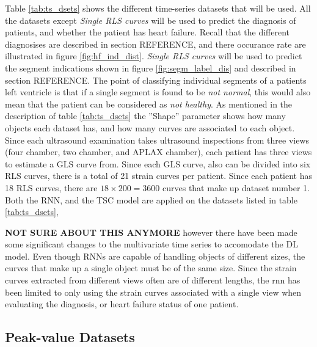 Table \ref{tab:ts_dsets} shows the different time-series datasets that will be used. 
All the datasets except \textit{Single RLS curves} will be used to predict the diagnosis of patients, and whether the patient has heart failure.
Recall that the different diagnosises are described in section REFERENCE, and there occurance rate are illustrated in figure \ref{fig:hf_ind_dist}.
\textit{Single RLS curves} will be used to predict the segment indications shown in figure \ref{fig:segm_label_dis} and described in section REFERENCE. 
The point of classifying individual segments of a patients left ventricle is that if a single segment is found to be \textit{not normal}, 
this would also mean that the patient can be considered as \textit{not healthy}.
As mentioned in the description of table \ref{tab:ts_dsets} the ''Shape'' parameter shows how many objects each dataset has, and how many curves are associated to each object. 
Since each ultrasound examination takes ultrasound inspections from three views (four chamber, two chamber, and APLAX chamber), each patient has three views to estimate a GLS curve from. 
Since each GLS curve, also can be divided into six RLS curves, there is a total of 21 strain curves per patient. 
Since each patient has 18 RLS curves, there are $18 \times 200 = 3600$ curves that make up dataset number 1.
Both the RNN, and the TSC model are applied on the datasets listed in table \ref{tab:ts_dsets}, 
\bigskip

\textbf{NOT SURE ABOUT THIS ANYMORE}
however there have been made some significant changes to the multivariate time series to accomodate the DL model.
Even though RNNs are capable of handling objects of different sizes, the curves that make up a single object must be of the same size.
Since the strain curves extracted from different views often are of different lengths, the \acrshort{rnn} has been limited to only using the strain curves associated with a single view
when evaluating the diagnosis, or heart failure status of one patient.

\subsection{Peak-value Datasets}

